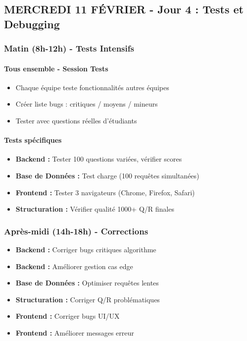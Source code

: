 \documentclass[11pt,a4paper]{article}
\begin{document}
\clearpage

\subsection{MERCREDI 11 FÉVRIER - Jour 4 : Tests et Debugging}

\subsubsection{Matin (8h-12h) - Tests Intensifs}

\paragraph{Tous ensemble - Session Tests}
\begin{itemize}
    \item[$\square$] Chaque équipe teste fonctionnalités autres équipes
    \item[$\square$] Créer liste bugs : critiques / moyens / mineurs
    \item[$\square$] Tester avec questions réelles d'étudiants
\end{itemize}

\paragraph{Tests spécifiques}
\begin{itemize}
    \item[$\square$] \textbf{Backend :} Tester 100 questions variées, vérifier scores
    \item[$\square$] \textbf{Base de Données :} Test charge (100 requêtes simultanées)
    \item[$\square$] \textbf{Frontend :} Tester 3 navigateurs (Chrome, Firefox, Safari)
    \item[$\square$] \textbf{Structuration :} Vérifier qualité 1000+ Q/R finales
\end{itemize}

\subsubsection{Après-midi (14h-18h) - Corrections}

\begin{itemize}
    \item[$\square$] \textbf{Backend :} Corriger bugs critiques algorithme
    \item[$\square$] \textbf{Backend :} Améliorer gestion cas edge
    \item[$\square$] \textbf{Base de Données :} Optimiser requêtes lentes
    \item[$\square$] \textbf{Structuration :} Corriger Q/R problématiques
    \item[$\square$] \textbf{Frontend :} Corriger bugs UI/UX
    \item[$\square$] \textbf{Frontend :} Améliorer messages erreur
\end{itemize}
\end{document}
